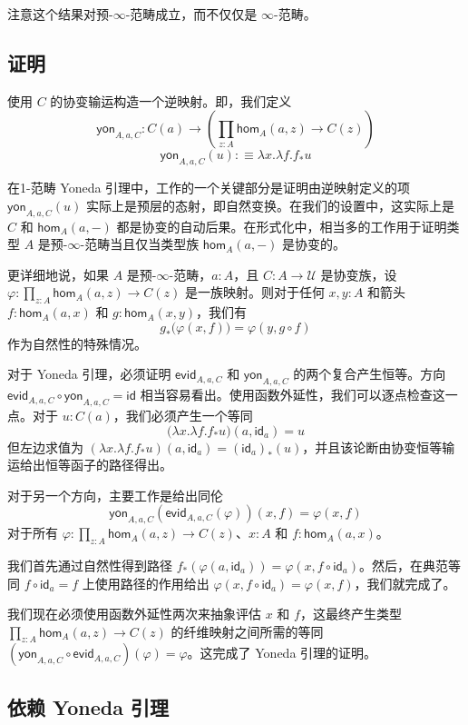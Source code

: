 \documentclass[12pt,a4paper]{article}
\theoremstyle{definition}
\theoremstyle{definition}
\begin{document}
注意这个结果对预-$\infty$-范畴成立，而不仅仅是 $\infty$-范畴。

\subsection{证明}

使用 $C$ 的协变输运构造一个逆映射。即，我们定义
\[
\mathsf{yon}_{A,a,C} : C(a) \to \left(\prod_{z:A} \mathsf{hom}_A(a,z) \to C(z)\right)
\]
\[
\mathsf{yon}_{A,a,C}(u) :\equiv \lambda x.\lambda f. f_*u
\]

在1-范畴 Yoneda 引理中，工作的一个关键部分是证明由逆映射定义的项 $\mathsf{yon}_{A,a,C}(u)$ 实际上是预层的态射，即自然变换。在我们的设置中，这实际上是 $C$ 和 $\mathsf{hom}_A(a,-)$ 都是协变的自动后果。在形式化中，相当多的工作用于证明类型 $A$ 是预-$\infty$-范畴当且仅当类型族 $\mathsf{hom}_A(a,-)$ 是协变的。

更详细地说，如果 $A$ 是预-$\infty$-范畴，$a:A$，且 $C:A \to \mathcal{U}$ 是协变族，设 $\varphi:\prod_{z:A} \mathsf{hom}_A(a,z) \to C(z)$ 是一族映射。则对于任何 $x,y:A$ 和箭头 $f:\mathsf{hom}_A(a,x)$ 和 $g:\mathsf{hom}_A(x,y)$，我们有
\[
g_*\big(\varphi(x,f)\big) = \varphi(y, g \circ f)
\]
作为自然性的特殊情况。

对于 Yoneda 引理，必须证明 $\mathsf{evid}_{A,a,C}$ 和 $\mathsf{yon}_{A,a,C}$ 的两个复合产生恒等。方向 $\mathsf{evid}_{A,a,C} \circ \mathsf{yon}_{A,a,C} = \mathsf{id}$ 相当容易看出。使用函数外延性，我们可以逐点检查这一点。对于 $u:C(a)$，我们必须产生一个等同
\[
\big(\lambda x.\lambda f. f_*u\big)(a, \mathsf{id}_a) = u
\]
但左边求值为 $(\lambda x.\lambda f. f_*u)(a, \mathsf{id}_a) = (\mathsf{id}_a)_*(u)$，并且该论断由协变恒等输运给出恒等函子的路径得出。

对于另一个方向，主要工作是给出同伦
\[
\mathsf{yon}_{A,a,C}(\mathsf{evid}_{A,a,C}(\varphi))(x,f) = \varphi(x,f)
\]
对于所有 $\varphi:\prod_{z:A} \mathsf{hom}_A(a,z) \to C(z)$、$x:A$ 和 $f:\mathsf{hom}_A(a,x)$。

我们首先通过自然性得到路径 $f_*(\varphi(a, \mathsf{id}_a)) = \varphi(x, f \circ \mathsf{id}_a)$。然后，在典范等同 $f \circ \mathsf{id}_a = f$ 上使用路径的作用给出 $\varphi(x, f \circ \mathsf{id}_a) = \varphi(x,f)$，我们就完成了。

我们现在必须使用函数外延性两次来抽象评估 $x$ 和 $f$，这最终产生类型 $\prod_{z:A} \mathsf{hom}_A(a,z) \to C(z)$ 的纤维映射之间所需的等同 $(\mathsf{yon}_{A,a,C} \circ \mathsf{evid}_{A,a,C})(\varphi) = \varphi$。这完成了 Yoneda 引理的证明。

\subsection{依赖 Yoneda 引理}
\end{document}
